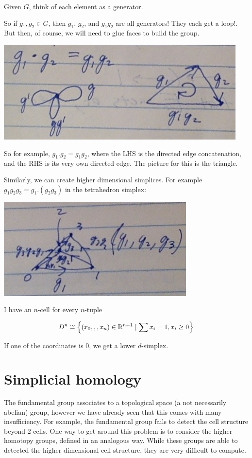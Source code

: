 \documentclass[11pt,leqno,oneside]{amsart}
\newenvironment{dateenv}{
  \vspace{1em}
}{
  \vspace{1em}
}
\newcommand{\mydate}[4]{
  \newdate{#1}{#2}{#3}{#4}
  \begin{dateenv}
    \hfill\displaydate{#1}
  \end{dateenv}
}
\numberwithin{thm}{section}
\begin{document}
Given $G$, think of each element as a generator.

So if $g_1, g_2 \in G$, then $g_1$, $g_2$, and $g_1g_2$ are all generators!  They each get a loop!.  But then, of course, we will need to glue faces to build the group.

\includegraphics[scale=0.3]{images/group-as-fund-group}

So for example, $g_1.g_2 = g_1g_2$, where the LHS is the directed edge concatenation, and the RHS is its very own directed edge.  The picture for this is the triangle.

Similarly, we can create higher dimensional simplices.  For example $g_1g_2g_3 = g_1.(g_2g_3)$ in the tetrahedron simplex:

\includegraphics[scale=0.4]{images/tetrahedron}

I have an $n$-cell for every $n$-tuple

$$D^n \mathrel{\cong} \left\{ (x_0,,,x_n) \in {\mathbb R}^{n+1} \mid \sum x_i = 1, x_i \geq 0 \right\}$$

If one of the coordinates is 0, we get a lower $d$-simplex.





\mydate{d13}{24}{2}{2017}

\section*{Simplicial homology}

The fundamental group associates to a topological space (a not
necessarily abelian) group, however we have already seen that this
comes with many insufficiency. For example, the fundamental group
fails to detect the cell structure beyond \(2\)-cells. One way to get
around this problem is to consider the higher homotopy groups, defined
in an analogous way. While these groups are able to detected the
higher dimensional cell structure, they are very difficult to compute.
\end{document}
